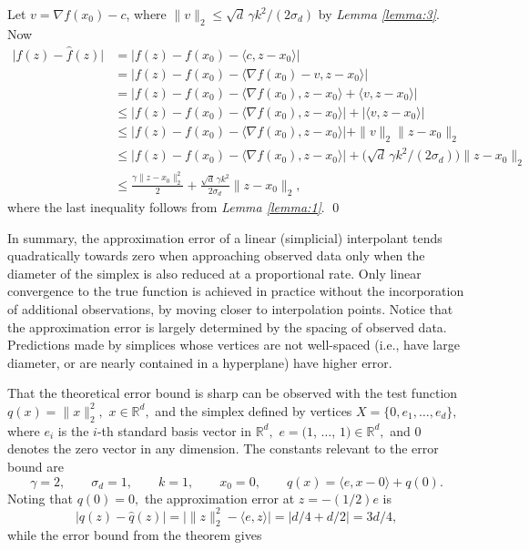 \begin{proofdot}
  Let $v = \nabla f(x_0) - c$, where $\|v\|_2 \leq \sqrt{d}\, \gamma k^2 / (2 \sigma_d)$ by {\it Lemma \ref{lemma:3}}. Now
  \begin{align*}
    \big|f(z) - \hat f(z)\big|
       &= \big|f(z) - f(x_0) - \langle c, z - x_0 \rangle \big| \\ 
       &= \big|f(z) - f(x_0) - \langle \nabla f(x_0) - v, z - x_0 \rangle \big| \\
       &= \big|f(z) - f(x_0) - \langle \nabla f(x_0) , z - x_0 \rangle + \langle v , z - x_0 \rangle \big| \\
       &\leq \big|f(z) - f(x_0) - \langle \nabla f(x_0) , z - x_0 \rangle \big| + \big| \langle v , z - x_0 \rangle \big| \\
       &\leq \big|f(z) - f(x_0) - \langle \nabla f(x_0) , z - x_0 \rangle \big| + \|v\|_2 \|z - x_0\|_2 \\
       &\leq \big|f(z) - f(x_0) - \langle \nabla f(x_0), z - x_0 \rangle \big| + \big(\sqrt{d}\,\gamma k^2 / (2 \sigma_d)\big) \|z - x_0\|_2 \\
       &\leq \frac{\gamma \|z - x_0\|_2^2}{2} + \frac{\sqrt{d}\,\gamma k^2}{2 \sigma_d} \|z - x_0\|_2,
  \end{align*}
  where the last inequality follows from {\it Lemma \ref{lemma:1}}.
  \qed
\end{proofdot}


In summary, the approximation error of a linear (simplicial)
interpolant tends quadratically towards zero when approaching observed
data only when the diameter of the simplex is also reduced at a
proportional rate. Only linear convergence to the true function
is achieved in practice without the
incorporation of additional observations, by moving closer to
  interpolation points. Notice that the approximation error is
largely determined by the spacing of observed data. Predictions made
by simplices whose vertices are not well-spaced (i.e., have large
diameter, or are nearly contained in a hyperplane) have higher error.

That the theoretical error bound is sharp can be observed with the
test function $q(x) = \|x\|_2^2,$ $x \in \mathbb{R}^d,$ and the
simplex defined by vertices $X = \{0, e_1, \ldots, e_d\},$ where $e_i$
is the $i$-th standard basis vector in $\mathbb{R}^d,$ $e = (1$,
$\ldots$, $1) \in \mathbb{R}^d,$ and $0$ denotes the zero vector in
any dimension.  The constants relevant to the error bound are
$$ \gamma = 2, \qquad \sigma_d = 1, \qquad k = 1, \qquad x_0 = 0,
\qquad \hat q(x) = \langle e, x - 0\rangle + q(0). $$
\noindent Noting that $q(0) = 0,$ the approximation error at $z =
-(1/2)e$ is
$$ \big|q(z) - \hat q(z)\big| = \big|\|z\|_2^2 - \langle e,z
\rangle\big| = \big| d/4 + d/2 \big| = 3d/4, $$
\noindent while the error bound from the theorem gives

